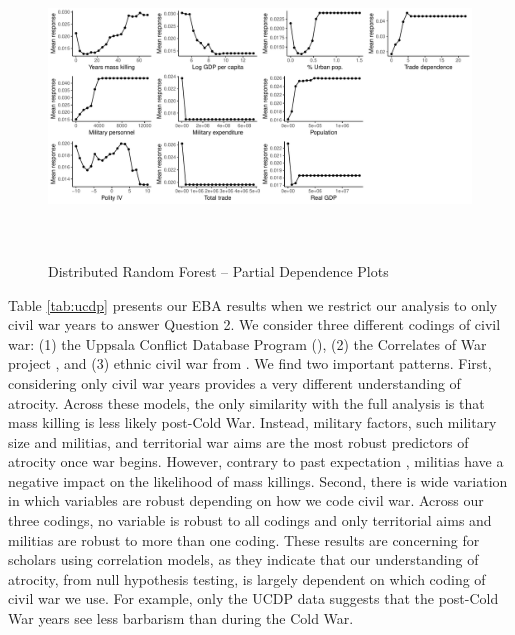 \documentclass[a4paper,12pt]{article}
\begin{document}
\begin{figure}[H]
    \centering
    \includegraphics[width=\textwidth, height=8cm]{images/rf-mk-pd.pdf}
    \caption{Distributed Random Forest -- Partial Dependence Plots}
    \label{fig:drfdpp}
\end{figure}


Table \ref{tab:ucdp} presents our EBA results when we restrict our analysis to only civil war years to answer Question 2. We consider three different codings of civil war: (1) the Uppsala Conflict Database Program  (\citeyear{allansson2017organized,gleditsch2002armed}), (2) the Correlates of War project \citep{sarkees2010resort}, and (3) ethnic civil war from \citet{cederman2010ethnic}. We find two important patterns. First, considering only civil war years provides a very different understanding of atrocity. Across these models, the only similarity with the full analysis is that mass killing is less likely post-Cold War. Instead, military factors, such military size and militias, and territorial war aims are the most robust predictors of atrocity once war begins. However, contrary to past expectation \citep{koren2017means}, militias have a negative impact on the likelihood of mass killings. Second, there is wide variation in which variables are robust depending on how we code civil war. Across our three codings, no variable is robust to all codings and only territorial aims and militias are robust to more than one coding. These results are concerning for scholars using correlation models, as they indicate that our understanding of atrocity, from null hypothesis testing, is largely dependent on which coding of civil war we use. For example, only the UCDP data suggests that the post-Cold War years see less barbarism than during the Cold War.
\end{document}
